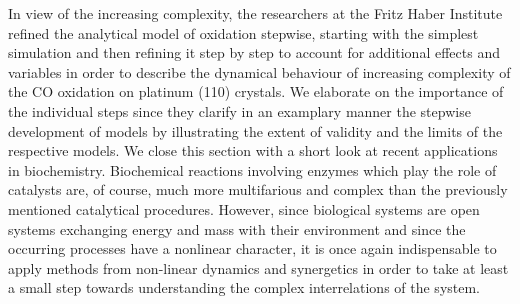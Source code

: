 \documentclass[12pt]{article}
\begin{document}
In view of the increasing complexity, the researchers at the Fritz Haber Institute
refined the analytical model of oxidation stepwise, starting with the simplest simulation
and then refining it step by step to account for additional effects and variables
in order to describe the dynamical behaviour of increasing complexity of the CO
oxidation on platinum (110) crystals. We elaborate on the importance of the individual
steps since they clarify in an examplary manner the stepwise development of
models by illustrating the extent of validity and the limits of the respective models.
We close this section with a short look at recent applications in biochemistry. Biochemical
reactions involving enzymes which play the role of catalysts are, of course,
much more multifarious and complex than the previously mentioned catalytical
procedures. However, since biological systems are open systems exchanging energy
and mass with their environment and since the occurring processes have a nonlinear
character, it is once again indispensable to apply methods from non-linear
dynamics and synergetics in order to take at least a small step towards understanding
the complex interrelations of the system.
\end{document}
